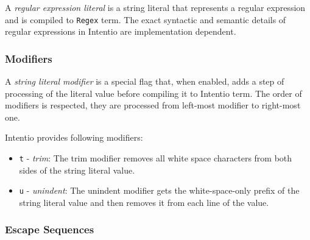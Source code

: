 A \emph{regular expression literal} is a string literal that represents a regular expression and is compiled to \lstinline{Regex} term. The exact syntactic and semantic details of regular expressions in Intentio are implementation dependent.

\subsubsection*{Modifiers}

\begin{bnf}
   \eq {} \gor {}
\end{bnf}

A \emph{string literal modifier} is a special flag that, when enabled, adds a step of processing of the literal value before compiling it to Intentio term. The order of modifiers is respected, they are processed from left-most modifier to right-most one.

Intentio provides following modifiers:

\begin{itemize}
  \item \texttt{t} - \emph{trim}: The trim modifier removes all white space characters from both sides of the string literal value.
  \item \texttt{u} - \emph{unindent}: The unindent modifier gets the white-space-only prefix of the string literal value and then removes it from each line of the value.
\end{itemize}

\subsubsection*{Escape Sequences}

\begin{bnf}
   \eq {} \gor {} \gor {} \gor {} \gor {} \gor \term{\textbackslash \textbackslash} \gor {} \\
   \eq {} \  \  \\
   \eq {} \  \ \term{\}} \\
  \\
   \eq {} \gor {} \gor {}
\end{bnf}

